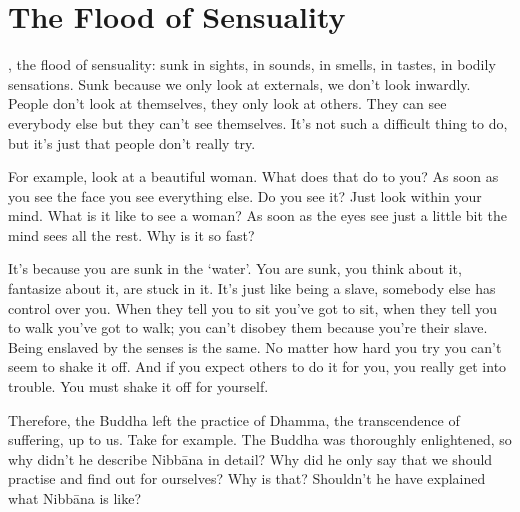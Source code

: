 
\chapter{The Flood of Sensuality}

\vspace*{0.5\baselineskip}
, the flood of sensuality: sunk in sights, in sounds, in smells, in tastes, in bodily sensations. Sunk because we only look at externals, we don't look inwardly. People don't look at themselves, they only look at others. They can see everybody else but they can't see themselves. It's not such a difficult thing to do, but it's just that people don't really try.

For example, look at a beautiful woman. What does that do to you? As soon as you see the face you see everything else. Do you see it? Just look within your mind. What is it like to see a woman? As soon as the eyes see just a little bit the mind sees all the rest. Why is it so fast?

It's because you are sunk in the `water'. You are sunk, you think about it, fantasize about it, are stuck in it. It's just like being a slave, somebody else has control over you. When they tell you to sit you've got to sit, when they tell you to walk you've got to walk; you can't disobey them because you're their slave. Being enslaved by the senses is the same. No matter how hard you try you can't seem to shake it off. And if you expect others to do it for you, you really get into trouble. You must shake it off for yourself.

Therefore, the Buddha left the practice of Dhamma, the transcendence of suffering, up to us. Take  for example. The Buddha was thoroughly enlightened, so why didn't he describe Nibb\=ana in detail? Why did he only say that we should practise and find out for ourselves? Why is that? Shouldn't he have explained what Nibb\=ana is like?

